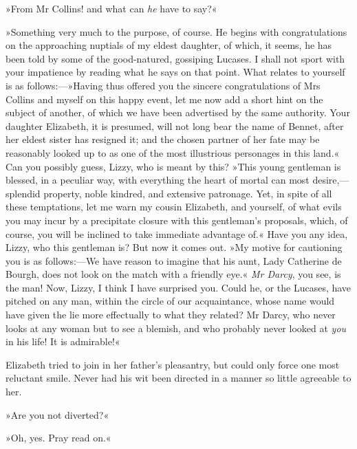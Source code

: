 »From Mr Collins! and what can \textit{he} have to say?«

»Something very much to the purpose, of course. He begins with congratulations on the approaching nuptials of my eldest daughter, of which, it seems, he has been told by some of the good-natured, gossiping Lucases. I shall not sport with your impatience by reading what he says on that point. What relates to yourself is as follows:—»Having thus offered you the sincere congratulations of Mrs Collins and myself on this happy event, let me now add a short hint on the subject of another, of which we have been advertised by the same authority. Your daughter Elizabeth, it is presumed, will not long bear the name of Bennet, after her eldest sister has resigned it; and the chosen partner of her fate may be reasonably looked up to as one of the most illustrious personages in this land.« Can you possibly guess, Lizzy, who is meant by this? »This young gentleman is blessed, in a peculiar way, with everything the heart of mortal can most desire,—splendid property, noble kindred, and extensive patronage. Yet, in spite of all these temptations, let me warn my cousin Elizabeth, and yourself, of what evils you may incur by a precipitate closure with this gentleman's proposals, which, of course, you will be inclined to take immediate advantage of.« Have you any idea, Lizzy, who this gentleman is? But now it comes out. »My motive for cautioning you is as follows:—We have reason to imagine that his aunt, Lady Catherine de Bourgh, does not look on the match with a friendly eye.« \textit{Mr Darcy}, you see, is the man! Now, Lizzy, I think I have surprised you. Could he, or the Lucases, have pitched on any man, within the circle of our acquaintance, whose name would have given the lie more effectually to what they related? Mr Darcy, who never looks at any woman but to see a blemish, and who probably never looked at \textit{you} in his life! It is admirable!«

Elizabeth tried to join in her father's pleasantry, but could only force one most reluctant smile. Never had his wit been directed in a manner so little agreeable to her.

»Are you not diverted?«

»Oh, yes. Pray read on.«

